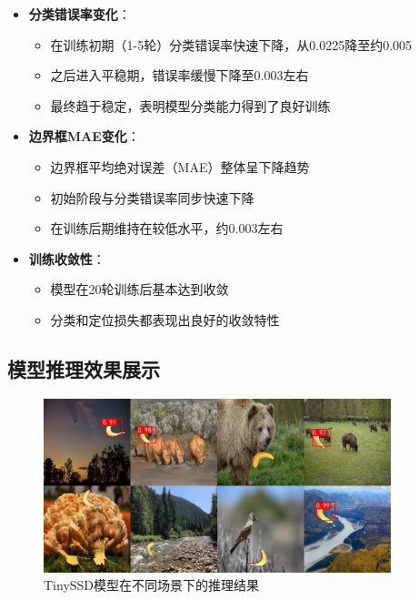 \documentclass[UTF8]{ctexart}
\begin{document}
\begin{itemize}
    \item \textbf{分类错误率变化}：
    \begin{itemize}
        \item 在训练初期（1-5轮）分类错误率快速下降，从0.0225降至约0.005
        \item 之后进入平稳期，错误率缓慢下降至0.003左右
        \item 最终趋于稳定，表明模型分类能力得到了良好训练
    \end{itemize}
    
    \item \textbf{边界框MAE变化}：
    \begin{itemize}
        \item 边界框平均绝对误差（MAE）整体呈下降趋势
        \item 初始阶段与分类错误率同步快速下降
        \item 在训练后期维持在较低水平，约0.003左右
    \end{itemize}
    
    \item \textbf{训练收敛性}：
    \begin{itemize}
        \item 模型在20轮训练后基本达到收敛
        \item 分类和定位损失都表现出良好的收敛特性
    \end{itemize}
\end{itemize}

\subsection{模型推理效果展示}

\begin{figure}[htbp]
    \centering
    \includegraphics[width=0.9\textwidth]{picture/combined_predictions_1.jpg}
    \caption{TinySSD模型在不同场景下的推理结果}
    \label{fig:detection_results}
\end{figure}
\end{document}
